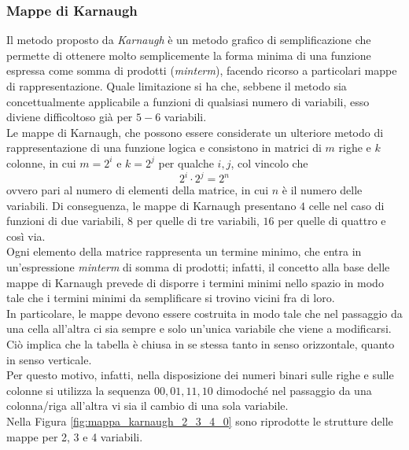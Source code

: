 \documentclass[a4paper]{extarticle}
\begin{document}
\subsubsection{Mappe di Karnaugh}
Il metodo proposto da \emph{Karnaugh} è un metodo grafico di semplificazione che permette di ottenere molto semplicemente la forma minima di una funzione espressa come somma di prodotti (\textit{minterm}), facendo ricorso a particolari mappe di rappresentazione. Quale limitazione si ha che, sebbene il metodo sia concettualmente applicabile a funzioni di qualsiasi numero di variabili, esso diviene difficoltoso già per \(5 - 6\) variabili.\\
Le mappe di Karnaugh, che possono essere considerate un ulteriore metodo di rappresentazione di una funzione logica e consistono in matrici di \(m\) righe e \(k\) colonne, in cui \(m = 2^i\) e \(k = 2^j\) per qualche \(i, j\), col vincolo che
\[2^i \cdot 2^j = 2^n\]
ovvero pari al numero di elementi della matrice, in cui \(n\) è il numero delle variabili. Di conseguenza, le mappe di Karnaugh presentano \(4\) celle nel caso di funzioni di due variabili, \(8\) per quelle di tre variabili, \(16\) per quelle di quattro e così via.\\
Ogni elemento della matrice rappresenta un termine minimo, che entra in un’espressione \textit{minterm} di somma di prodotti; infatti, il concetto alla base delle mappe di Karnaugh prevede di disporre i termini minimi nello spazio in modo tale che i termini minimi da semplificare si trovino vicini fra di loro.\\
In particolare, le mappe devono essere costruita in modo tale che nel passaggio da una cella all'altra ci sia sempre e solo un'unica variabile che viene a modificarsi. Ciò implica che la tabella è chiusa in se stessa tanto in senso orizzontale, quanto in senso verticale.\\
Per questo motivo, infatti, nella disposizione dei numeri binari sulle righe e sulle colonne si utilizza la sequenza \(00, 01, 11, 10\) dimodoché nel passaggio da una colonna/riga all'altra vi sia il cambio di una sola variabile.\\
Nella Figura \ref{fig:mappa_karnaugh_2_3_4_0} sono riprodotte le strutture delle mappe per 2, 3 e 4 variabili.
\end{document}
